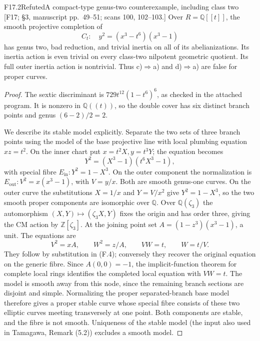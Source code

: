 \begin{result}{F17.2}{Refuted}{A compact-type genus-two counterexample, including class two}
\textup{[F17; \S3, manuscript pp.\ 49--51; scans 100, 102--103.]}
Over $R=\mathbb Q[[t]]$, the smooth projective completion of
\[
 C_t:\quad y^2=(x^3-t^6)(x^3-1)                         \tag{F.4}
\]
has genus two, bad reduction, and trivial inertia on all of its
abelianizations. Its inertia action is even trivial on every
class-two nilpotent geometric quotient. Its full outer inertia
action is nontrivial. Thus c)$\Rightarrow$a) and d)$\Rightarrow$a)
are false for proper curves.
\end{result}

\begin{proof}
The sextic discriminant is
$729t^{12}(1-t^6)^6$, as checked in the attached program. It is
nonzero in $\mathbb Q((t))$, so the double cover has six distinct
branch points and genus $(6-2)/2=2$.

We describe its stable model explicitly. Separate the two sets of
three branch points using the model of the base projective line with
local plumbing equation $xz=t^2$. On the inner chart put
$x=t^2X,y=t^3Y$; the equation becomes
\[
 Y^2=(X^3-1)(t^6X^3-1),
\]
with special fibre $E_{\mathrm{in}}:Y^2=1-X^3$. On the outer
component the normalization is
$E_{\mathrm{out}}:V^2=x(x^3-1)$, with $V=y/x$.
Both are smooth genus-one curves.
On the outer curve the substitutions $X=1/x$ and $Y=V/x^2$
give $Y^2=1-X^3$, so the two smooth proper components are
isomorphic over $\mathbb Q$. Over $\mathbb Q(\zeta_3)$ the
automorphism $(X,Y)\mapsto(\zeta_3X,Y)$ fixes the origin and
has order three, giving the CM action by $\mathbb Z[\zeta_3]$.
At the joining point set
$A=(1-z^3)(x^3-1)$, a unit. The equations are
\[
 V^2=xA,\qquad W^2=z/A,\qquad VW=t,
 \qquad W=t/V.
\]
They follow by substitution in (F.4); conversely they recover the
original equation on the generic fibre. Since $A(0,0)=-1$, the
implicit-function theorem for complete local rings identifies the
completed local equation with $VW=t$. The model is smooth away
from this node, since the remaining branch sections are disjoint
and simple. Normalizing the proper separated-branch base model
therefore gives a proper stable curve whose special fibre consists
of these two elliptic curves meeting transversely at one point.
Both components are stable, and the fibre is not smooth. Uniqueness
of the stable model (the input also used in Tamagawa, Remark (5.2))
excludes a smooth model.


\end{proof}

